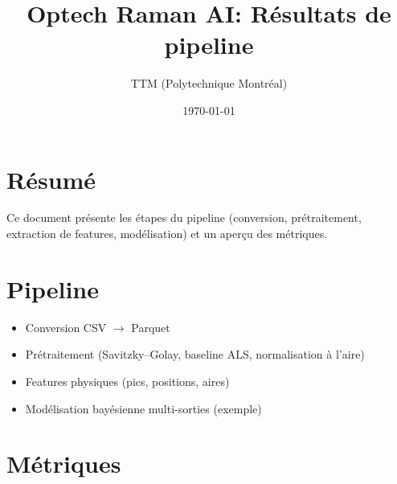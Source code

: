 \documentclass[11pt]{article}
\title{Optech Raman AI: Résultats de pipeline}
\author{TTM (Polytechnique Montréal)}
\date{\today}
\begin{document}
\maketitle

\section{Résumé}
Ce document présente les étapes du pipeline (conversion, prétraitement, extraction de features, modélisation) et un aperçu des métriques.

\section{Pipeline}
\begin{itemize}
\item Conversion CSV $\rightarrow$ Parquet
\item Prétraitement (Savitzky--Golay, baseline ALS, normalisation à l'aire)
\item Features physiques (pics, positions, aires)
\item Modélisation bayésienne multi-sorties (exemple)
\end{itemize}

\section{Métriques}




\end{document}

